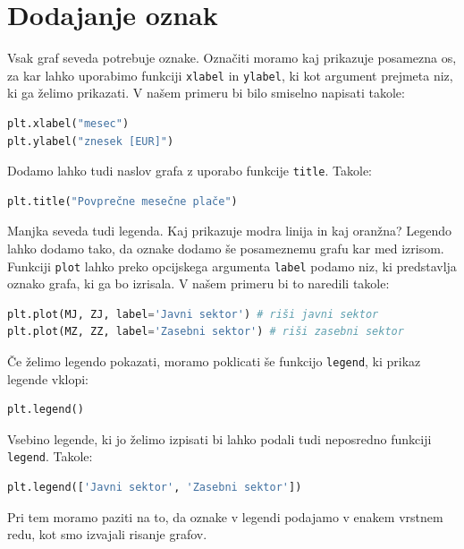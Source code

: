 \section{Dodajanje oznak}
Vsak graf seveda potrebuje oznake. Označiti moramo kaj prikazuje posamezna os, za kar lahko uporabimo funkciji \texttt{xlabel} in \texttt{ylabel}, ki kot argument prejmeta niz, ki ga želimo prikazati. V našem primeru bi bilo smiselno napisati takole:
\begin{lstlisting}[language=Python, showstringspaces=false]
plt.xlabel("mesec")
plt.ylabel("znesek [EUR]")
\end{lstlisting}
Dodamo lahko tudi naslov grafa z uporabo funkcije \texttt{title}. Takole:
\begin{lstlisting}[language=Python, showstringspaces=false]
plt.title("Povprečne mesečne plače")
\end{lstlisting}

Manjka seveda tudi legenda. Kaj prikazuje modra linija in kaj oranžna? Legendo lahko dodamo tako, da oznake dodamo še posameznemu grafu kar med izrisom. Funkciji \texttt{plot} lahko preko opcijskega argumenta \texttt{label} podamo niz, ki predstavlja oznako grafa, ki ga bo izrisala. V našem primeru bi to naredili takole:
\begin{lstlisting}[language=Python, showstringspaces=false]
plt.plot(MJ, ZJ, label='Javni sektor') # riši javni sektor
plt.plot(MZ, ZZ, label='Zasebni sektor') # riši zasebni sektor
\end{lstlisting}
Če želimo legendo pokazati, moramo poklicati še funkcijo \texttt{legend}, ki prikaz legende vklopi:
\begin{lstlisting}[language=Python, showstringspaces=false]
plt.legend()
\end{lstlisting}
Vsebino legende, ki jo želimo izpisati bi lahko podali tudi neposredno funkciji \texttt{legend}. Takole:
\begin{lstlisting}[language=Python, showstringspaces=false]
plt.legend(['Javni sektor', 'Zasebni sektor'])
\end{lstlisting}
Pri tem moramo paziti na to, da oznake v legendi podajamo v enakem vrstnem redu, kot smo izvajali risanje grafov.


